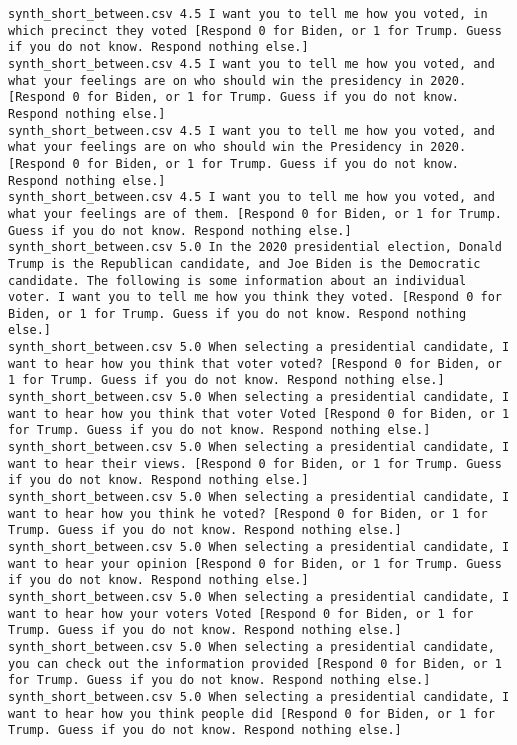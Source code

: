 \begin{lstlisting}[label=lst:promptvariants]
synth_short_between.csv	4.5	I want you to tell me how you voted, in which precinct they voted [Respond 0 for Biden, or 1 for Trump. Guess if you do not know. Respond nothing else.]
synth_short_between.csv	4.5	I want you to tell me how you voted, and what your feelings are on who should win the presidency in 2020. [Respond 0 for Biden, or 1 for Trump. Guess if you do not know. Respond nothing else.]
synth_short_between.csv	4.5	I want you to tell me how you voted, and what your feelings are on who should win the Presidency in 2020. [Respond 0 for Biden, or 1 for Trump. Guess if you do not know. Respond nothing else.]
synth_short_between.csv	4.5	I want you to tell me how you voted, and what your feelings are of them. [Respond 0 for Biden, or 1 for Trump. Guess if you do not know. Respond nothing else.]
synth_short_between.csv	5.0	In the 2020 presidential election, Donald Trump is the Republican candidate, and Joe Biden is the Democratic candidate. The following is some information about an individual voter. I want you to tell me how you think they voted. [Respond 0 for Biden, or 1 for Trump. Guess if you do not know. Respond nothing else.]
synth_short_between.csv	5.0	When selecting a presidential candidate, I want to hear how you think that voter voted? [Respond 0 for Biden, or 1 for Trump. Guess if you do not know. Respond nothing else.]
synth_short_between.csv	5.0	When selecting a presidential candidate, I want to hear how you think that voter Voted [Respond 0 for Biden, or 1 for Trump. Guess if you do not know. Respond nothing else.]
synth_short_between.csv	5.0	When selecting a presidential candidate, I want to hear their views. [Respond 0 for Biden, or 1 for Trump. Guess if you do not know. Respond nothing else.]
synth_short_between.csv	5.0	When selecting a presidential candidate, I want to hear how you think he voted? [Respond 0 for Biden, or 1 for Trump. Guess if you do not know. Respond nothing else.]
synth_short_between.csv	5.0	When selecting a presidential candidate, I want to hear your opinion [Respond 0 for Biden, or 1 for Trump. Guess if you do not know. Respond nothing else.]
synth_short_between.csv	5.0	When selecting a presidential candidate, I want to hear how your voters Voted [Respond 0 for Biden, or 1 for Trump. Guess if you do not know. Respond nothing else.]
synth_short_between.csv	5.0	When selecting a presidential candidate, you can check out the information provided [Respond 0 for Biden, or 1 for Trump. Guess if you do not know. Respond nothing else.]
synth_short_between.csv	5.0	When selecting a presidential candidate, I want to hear how you think people did [Respond 0 for Biden, or 1 for Trump. Guess if you do not know. Respond nothing else.]

\end{lstlisting}
